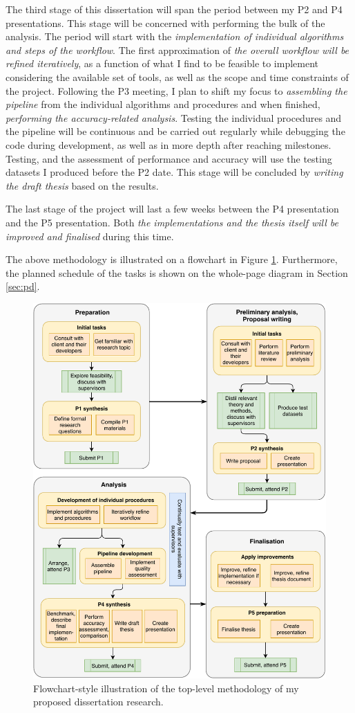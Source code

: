 The third stage of this dissertation will span the period between my P2 and P4 presentations. This stage will be concerned with performing the bulk of the analysis. The period will start with the \textit{implementation of individual algorithms and steps of the workflow}. The first approximation of \textit{the overall workflow will be refined iteratively}, as a function of what I find to be feasible to implement considering the available set of tools, as well as the scope and time constraints of the project. Following the P3 meeting, I plan to shift my focus to \textit{assembling the pipeline} from the individual algorithms and procedures and when finished, \textit{performing the accuracy-related analysis}. Testing the individual procedures and the pipeline will be continuous and be carried out regularly while debugging the code during development, as well as in more depth after reaching milestones. Testing, and the assessment of performance and accuracy will use the testing datasets I produced before the P2 date. This stage will be concluded by \textit{writing the draft thesis} based on the results.

The last stage of the project will last a few weeks between the P4 presentation and the P5 presentation. Both \textit{the implementations and the thesis itself will be improved and finalised} during this time.

The above methodology is illustrated on a flowchart in Figure \ref{fig:methodflow}. Furthermore, the planned schedule of the tasks is shown on the whole-page diagram in Section \ref{sec:pd}.

\begin{figure}[]
    \centering
    \includegraphics[width=0.9\linewidth]{p2/figs/methodology.pdf}
    \caption{Flowchart-style illustration of the top-level methodology of my proposed dissertation research.}
    \label{fig:methodflow}
\end{figure}

